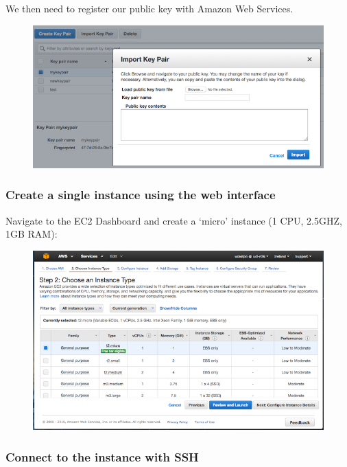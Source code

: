 We then need to register our public key with Amazon Web Services.

\begin{figure}[htbp]
\centering
\includegraphics{96Cloud/figures/key_pair.png}
\end{figure}

\subsubsection{Create a single instance using the web
interface}\label{create-a-single-instance-using-the-web-interface}

Navigate to the EC2 Dashboard and create a `micro' instance (1 CPU,
2.5GHZ, 1GB RAM):

\begin{figure}[htbp]
\centering
\includegraphics{96Cloud/figures/create_ec2_instance.png}
\end{figure}

\subsubsection{Connect to the instance with
SSH}\label{connect-to-the-instance-with-ssh}

